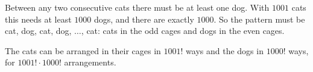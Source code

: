 Between any two consecutive cats there must be at least one dog. With $1001$ cats this needs at least $1000$ dogs, and there are exactly $1000$. So the pattern must be cat, dog, cat, dog, $\dots$, cat: cats in the odd cages and dogs in the even cages.

The cats can be arranged in their cages in $1001!$ ways and the dogs in $1000!$ ways, for $\boxed{1001!\cdot1000!}$ arrangements.
